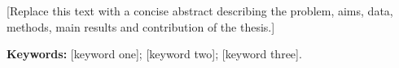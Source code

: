 [Replace this text with a concise abstract describing the problem, aims,
data, methods, main results and contribution of the thesis.]

\noindent\textbf{Keywords:} [keyword one]; [keyword two]; [keyword three].
